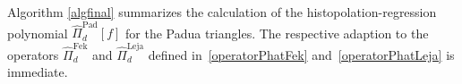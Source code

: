 \documentclass{svjour3}
\begin{document}

Algorithm \ref{algfinal} summarizes the calculation of the histopolation-regression polynomial $\hat{\Pi}_d^{\mathrm{Pad}}[f]$ for the Padua triangles. The respective adaption to the operators $\hat{\Pi}^{\mathrm{Fek}}_{d}$ and $\hat{\Pi}^{\mathrm{Leja}}_{d}$ defined in~\eqref{operatorPhatFek} and~\eqref{operatorPhatLeja} is immediate. 
\end{document}

